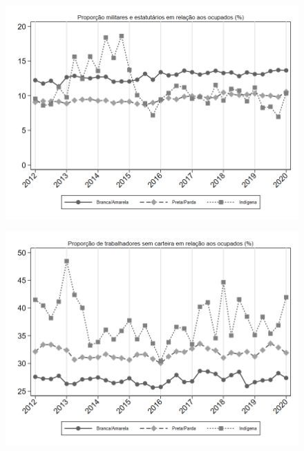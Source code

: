 \begin{frame}[label=_composicao_demografica_raca_prop_militar]{}
\textit{\hyperlink{_composicao_demografica_raca}{}}
\begin{figure}
  \centering
  \includegraphics[width=1.0\linewidth]{../../analysis/output/composicao_demografica/raca/_composicao_demografica_raca_prop_militar.png}
  \caption{}
  \label{fig:_composicao_demografica_raca_prop_militar}
\end{figure}
\end{frame}


\begin{frame}[label=_composicao_demografica_raca_prop_empregadoSC]{}
\textit{\hyperlink{_composicao_demografica_raca}{}}
\begin{figure}
  \centering
  \includegraphics[width=1.0\linewidth]{../../analysis/output/composicao_demografica/raca/_composicao_demografica_raca_prop_empregadoSC.png}
  \caption{}
  \label{fig:_composicao_demografica_raca_prop_empregadoSC}
\end{figure}
\end{frame}

